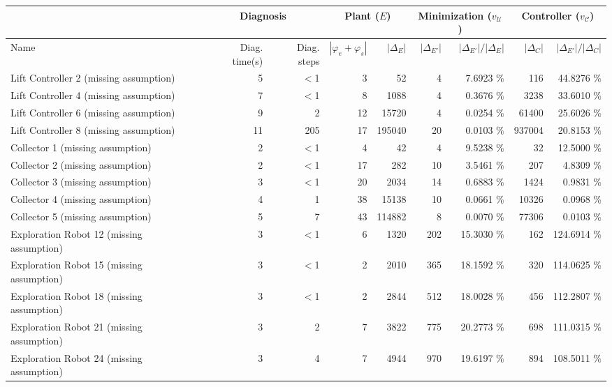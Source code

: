 \begin{tabular}{|l|rr|rr|rr|rr|}
  \hline & \multicolumn{2}{c|}{Diagnosis}&\multicolumn{2}{c|}{Plant ($E$)} & \multicolumn{2}{c|}{Minimization ($v_{\mathcal{U}}$)} & \multicolumn{2}{c|}{Controller ($v_{\mathcal{C}}$)}\\ \hline
Name & Diag. time(s) & Diag. steps & $|\varphi_e + \varphi_s|$ & $|\Delta_E|$ & $|\Delta_{E'}|$ & $|\Delta_{E'}|/|\Delta_{E}|$ & $|\Delta_{C}|$ & $|\Delta_{E'}|/|\Delta_{C}|$ \\ 
  \hline
Lift Controller 2 (missing assumption) &    5 & $<$1 & 3 & 52 & 4 &  7.6923 \% & 116 &  44.8276 \% \\ 
  Lift Controller 4 (missing assumption) &    7 & $<$1 & 8 & 1088 & 4 &  0.3676 \% & 3238 &  33.6010 \% \\ 
  Lift Controller 6 (missing assumption) &    9 & 2 & 12 & 15720 & 4 &  0.0254 \% & 61400 &  25.6026 \% \\ 
  Lift Controller 8 (missing assumption) &   11 & 205 & 17 & 195040 & 20 &  0.0103 \% & 937004 &  20.8153 \% \\ 
  Collector 1 (missing assumption) &    2 & $<$1 & 4 & 42 & 4 &  9.5238 \% & 32 &  12.5000 \% \\ 
  Collector 2 (missing assumption) &    2 & $<$1 & 17 & 282 & 10 &  3.5461 \% & 207 &   4.8309 \% \\ 
  Collector 3 (missing assumption) &    3 & $<$1 & 20 & 2034 & 14 &  0.6883 \% & 1424 &   0.9831 \% \\ 
  Collector 4 (missing assumption) &    4 & 1 & 38 & 15138 & 10 &  0.0661 \% & 10326 &   0.0968 \% \\ 
  Collector 5 (missing assumption) &    5 & 7 & 43 & 114882 & 8 &  0.0070 \% & 77306 &   0.0103 \% \\ 
  Exploration Robot 12 (missing assumption) &    3 & $<$1 & 6 & 1320 & 202 & 15.3030 \% & 162 & 124.6914 \% \\ 
  Exploration Robot 15 (missing assumption) &    3 & $<$1 & 2 & 2010 & 365 & 18.1592 \% & 320 & 114.0625 \% \\ 
  Exploration Robot 18 (missing assumption) &    3 & $<$1 & 2 & 2844 & 512 & 18.0028 \% & 456 & 112.2807 \% \\ 
  Exploration Robot 21 (missing assumption) &    3 & 2 & 7 & 3822 & 775 & 20.2773 \% & 698 & 111.0315 \% \\ 
  Exploration Robot 24 (missing assumption) &    3 & 4 & 7 & 4944 & 970 & 19.6197 \% & 894 & 108.5011 \% \\ 

\end{tabular}
